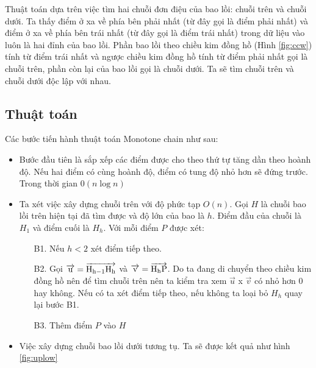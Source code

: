 \documentclass[12pt]{article}
\begin{document}
        Thuật toán dựa trên việc tìm hai chuỗi đơn điệu của bao lồi: chuỗi trên và chuỗi dưới. 
        Ta thấy điểm ở xa về phía bên phải nhất (từ đây gọi là điểm phải nhất) và điểm ở xa về phía bên trái nhất 
        (từ đây gọi là điểm trái nhất) trong dữ liệu vào luôn là hai đỉnh của bao lồi. 
        Phần bao lồi theo chiều kim đồng hồ (Hình \ref{fig:ccw}) tính từ điểm trái nhất và ngược chiều kim đồng hồ tính từ điểm phải nhất gọi là chuỗi trên, 
        phần còn lại của bao lồi gọi là chuỗi dưới.
        Ta sẽ tìm chuỗi trên và chuỗi dưới độc lập với nhau.
      \newpage
      \subsection{Thuật toán}
        Các bước tiến hành thuật toán Monotone chain như sau:
        \begin{itemize}
          \item Bước đầu tiên là sắp xếp các điểm được cho theo thứ tự tăng dần theo hoành độ. Nếu hai điểm có cùng hoành độ, điểm có tung độ nhỏ hơn sẽ đứng trước. Trong thời gian $0(n \log n)$
          \item Ta xét việc xây dựng chuỗi trên với độ phức tạp $O(n)$. 
            Gọi $H$ là chuỗi bao lồi trên hiện tại đã tìm được và độ lớn của bao là $h$. Điểm đầu của chuỗi là $H_1$ và điểm cuối là $H_h$. Với mỗi điểm $P$ được xét:
            \begin{itemize}
              \item[B1.] Nếu $h < 2$ xét điểm tiếp theo.
              \item[B2.] Gọi $\overrightarrow{\rm u} = \overrightarrow{\rm H_{h-1}H_{h}}$ và $\overrightarrow{\rm v} = \overrightarrow{\rm H_hP}$. 
                Do ta đang di chuyển theo chiều kim đồng hồ nên để tìm chuỗi trên nên ta kiểm tra xem $\overrightarrow{u}$ x $\overrightarrow{v}$ có nhỏ hơn 0 hay không.
                Nếu có ta xét điểm tiếp theo, nếu không ta loại bỏ $H_h$ quay lại bước B1.
              \item[B3.] Thêm điểm $P$ vào $H$
            \end{itemize}
          \item Việc xây dựng chuỗi bao lồi dưới tương tụ. Ta sẽ được kết quả như hình \ref{fig:uplow}
        \end{itemize}
      \newpage
\end{document}

